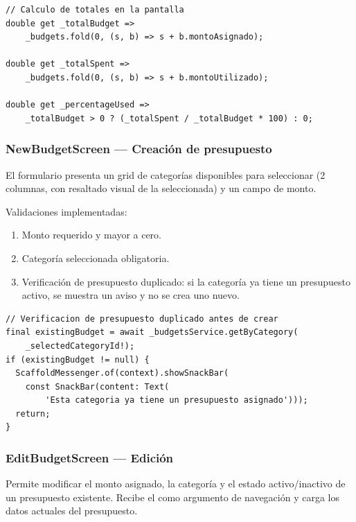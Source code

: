\begin{lstlisting}[style=dart,
    caption={Cálculo de totales en BudgetsScreen}]
// Calculo de totales en la pantalla
double get _totalBudget =>
    _budgets.fold(0, (s, b) => s + b.montoAsignado);

double get _totalSpent =>
    _budgets.fold(0, (s, b) => s + b.montoUtilizado);

double get _percentageUsed =>
    _totalBudget > 0 ? (_totalSpent / _totalBudget * 100) : 0;
\end{lstlisting}

\subsubsection*{NewBudgetScreen — Creación de presupuesto}

El formulario presenta un grid de categorías disponibles para seleccionar
(2 columnas, con resaltado visual de la seleccionada) y un campo de monto.

Validaciones implementadas:

\begin{enumerate}
  \item Monto requerido y mayor a cero.
  \item Categoría seleccionada obligatoria.
  \item Verificación de presupuesto duplicado: si la categoría ya tiene
        un presupuesto activo, se muestra un aviso y no se crea uno
        nuevo.
\end{enumerate}

\begin{lstlisting}[style=dart,
    caption={Verificación de presupuesto duplicado}]
// Verificacion de presupuesto duplicado antes de crear
final existingBudget = await _budgetsService.getByCategory(
    _selectedCategoryId!);
if (existingBudget != null) {
  ScaffoldMessenger.of(context).showSnackBar(
    const SnackBar(content: Text(
        'Esta categoria ya tiene un presupuesto asignado')));
  return;
}
\end{lstlisting}

\subsubsection*{EditBudgetScreen — Edición}

Permite modificar el monto asignado, la categoría y el estado
activo/inactivo de un presupuesto existente. Recibe el 
como argumento de navegación y carga los datos actuales del presupuesto.

